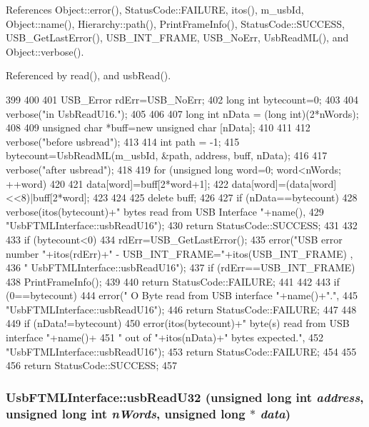 References Object::error(), StatusCode::FAILURE, itos(), m\_\-usbId, Object::name(), Hierarchy::path(), PrintFrameInfo(), StatusCode::SUCCESS, USB\_\-GetLastError(), USB\_\-INT\_\-FRAME, USB\_\-NoErr, UsbReadML(), and Object::verbose().

Referenced by read(), and usbRead().


\begin{DoxyCode}
399                                                                {
400   
401   USB_Error rdErr=USB_NoErr;
402   long int bytecount=0;
403 
404   verbose("in UsbReadU16.");
405 
406 
407   long int nData = (long int)(2*nWords);
408   
409   unsigned char *buff=new unsigned char [nData];
410 
411   
412   verbose("before usbread");
413 
414   int path  = -1;
415   bytecount=UsbReadML(m_usbId, &path, address, buff, nData);
416   
417   verbose("after usbread");
418   
419   for (unsigned long word=0; word<nWords; ++word)
420   {
421     data[word]=buff[2*word+1];
422     data[word]=(data[word]<<8)|buff[2*word];
423   }
424 
425   delete buff;
426 
427   if (nData==bytecount){
428     verbose(itos(bytecount)+" bytes read from USB Interface "+name(),
429             "UsbFTMLInterface::usbReadU16");
430     return StatusCode::SUCCESS;
431   }
432 
433   if (bytecount<0){
434     rdErr=USB_GetLastError();
435     error("USB error number "+itos(rdErr)+" - USB_INT_FRAME="+itos(USB_INT_FRAME)
      ,
436             " UsbFTMLInterface::usbReadU16");
437     if (rdErr==USB_INT_FRAME){
438       PrintFrameInfo();
439     } 
440     return StatusCode::FAILURE;
441   }
442   
443   if (0==bytecount){
444     error(" O Byte read from USB interface "+name()+".",
445           "UsbFTMLInterface::usbReadU16");
446     return StatusCode::FAILURE;
447   }
448 
449   if (nData!=bytecount){
450     error(itos(bytecount)+" byte(s) read from USB interface "+name()+
451             " out of "+itos(nData)+" bytes expected.",
452           "UsbFTMLInterface::usbReadU16");
453     return StatusCode::FAILURE;    
454   }
455 
456   return StatusCode::SUCCESS;
457 }
\end{DoxyCode}
\hypertarget{classUsbFTMLInterface_aa1256fc56698bc9ed1bcf11ecc6ff766}{
\subsubsection[{usbReadU32}]{ UsbFTMLInterface::usbReadU32 (unsigned long int {\em address}, \/  unsigned long int {\em nWords}, \/  unsigned long $\ast$ {\em data})}}
\label{classUsbFTMLInterface_aa1256fc56698bc9ed1bcf11ecc6ff766}


